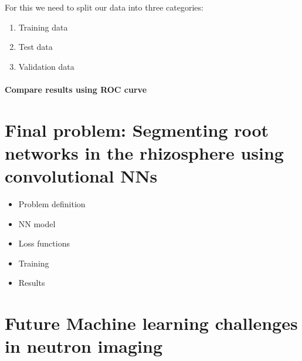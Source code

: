 \documentclass[letterpaper,10pt,english]{sphinxmanual}
\begin{document}
For this we need to split our data into three categories:
\begin{enumerate}
%
\item {} 
Training data

\item {} 
Test data

\item {} 
Validation data

\end{enumerate}


\subsubsection{Compare results using ROC curve}
\label{\detokenize{ML4NeutronImageSegmentation:compare-results-using-roc-curve}}

\chapter{Final problem: Segmenting root networks in the rhizosphere using convolutional NNs}
\label{\detokenize{ML4NeutronImageSegmentation:final-problem-segmenting-root-networks-in-the-rhizosphere-using-convolutional-nns}}\begin{itemize}
\item {} 
Problem definition

\item {} 
NN model

\item {} 
Loss functions

\item {} 
Training

\item {} 
Results

\end{itemize}


\chapter{Future Machine learning challenges in neutron imaging}
\label{\detokenize{ML4NeutronImageSegmentation:future-machine-learning-challenges-in-neutron-imaging}}






\renewcommand{\indexname}{Index}
\printindex
\end{document}
